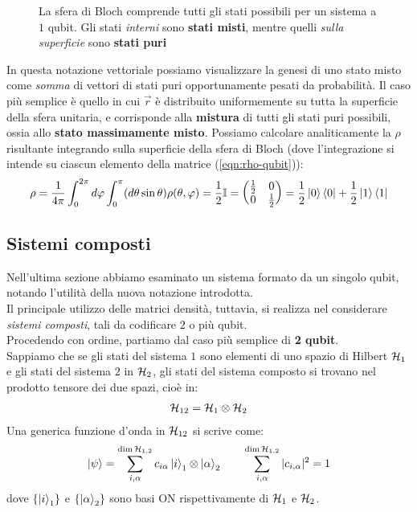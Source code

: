 \documentclass[../../InformazioneQuantistica.tex]{subfiles}
\begin{document}
\begin{figure}
    \centering
    
    \caption{La sfera di Bloch comprende tutti gli stati possibili per un sistema a $1$ qubit. Gli stati \textit{interni} sono \textbf{stati misti}, mentre quelli \textit{sulla superficie} sono \textbf{stati puri}}
    \label{fig:sfera-bloch-stati}
\end{figure}

In questa notazione vettoriale possiamo visualizzare la genesi di uno stato misto come \textit{somma} di vettori di stati puri opportunamente pesati da probabilità. Il caso più semplice è quello in cui $\vec{r}$ è distribuito uniformemente su tutta la superficie della sfera unitaria, e corrisponde alla \textbf{mistura} di tutti gli stati puri possibili, ossia allo \textbf{stato massimamente misto}. Possiamo calcolare analiticamente la $\rho$ risultante integrando sulla superficie della sfera di Bloch (dove l'integrazione si intende su ciascun elemento della matrice (\ref{eqn:rho-qubit})):
\begin{align*}
\rho = \frac{1}{4\pi}\int_0^{2\pi} d\varphi \int_0^\pi (d\theta \sin\theta) \rho(\theta,\varphi) = \frac{1}{2}\mathbb{I} = \begin{pmatrix}
\frac{1}{2} & 0 \\ 0 & \frac{1}{2}\end{pmatrix} = \frac{1}{2}\Ket{0}\Bra{0} + \frac{1}{2}\Ket{1}\Bra{1}
\end{align*}

\subsection{Sistemi composti}
Nell'ultima sezione abbiamo esaminato un sistema formato da un singolo qubit, notando l'utilità della nuova notazione introdotta.\\
Il principale utilizzo delle matrici densità, tuttavia, si realizza nel considerare \textit{sistemi composti}, tali da codificare $2$ o più qubit.\\
Procedendo con ordine, partiamo dal caso più semplice di \textbf{2 qubit}.\\
Sappiamo che se gli stati del sistema $1$ sono elementi di uno spazio di Hilbert $\mathcal{H}_1$ e gli stati del sistema $2$ in $\mathcal{H}_2$, gli stati del sistema composto si trovano nel prodotto tensore dei due spazi, cioè in:
\begin{align*}
\mathcal{H}_{12} = \mathcal{H}_1 \otimes \mathcal{H}_2
\end{align*}
Una generica funzione d'onda in $\mathcal{H}_{12}$ si scrive come:
\begin{align*}
\Ket{\psi} = \sum_{i,\alpha}^{\operatorname{dim}\mathcal{H}_{1,2}} c_{i\alpha} \Ket{i}_1 \otimes \Ket{\alpha}_2 \qquad \sum_{i,\alpha}^{\operatorname{dim}\mathcal{H}_{1,2}} |c_{i,\alpha}|^2 = 1
\end{align*}
dove $\{\Ket{i}_1\}$ e $\{\Ket{\alpha}_2\}$ sono basi ON rispettivamente di $\mathcal{H}_1$ e $\mathcal{H}_2$.\\
\end{document}
